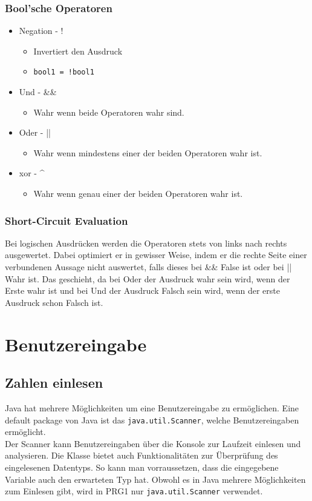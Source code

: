 \documentclass{article}
\begin{document}
	\subsubsection{Bool'sche Operatoren}
	\begin{itemize}
		\item{Negation - !}
		\begin{itemize}
			\item{Invertiert den Ausdruck}
			\item{\verb|bool1 = !bool1|}
		\end{itemize}
		\item{Und - \&\&}
		\begin{itemize}
			\item{Wahr wenn beide Operatoren wahr sind.}
		\end{itemize}
		\item{Oder - ||}
		\begin{itemize}
			\item{Wahr wenn mindestens einer der beiden Operatoren wahr ist.}
		\end{itemize}
		\item{xor - \^{}}
		\begin{itemize}
			\item{Wahr wenn genau einer der beiden Operatoren wahr ist.}
		\end{itemize}
	\end{itemize}
	\subsubsection{Short-Circuit Evaluation}
	Bei logischen Ausdrücken werden die Operatoren stets von links nach rechts ausgewertet. Dabei optimiert er in gewisser Weise, indem er die rechte Seite einer verbundenen Aussage nicht auswertet, falls dieses bei \&\& False ist oder bei || Wahr ist. Das geschieht, da bei Oder der Ausdruck wahr sein wird, wenn der Erste wahr ist und bei Und der Ausdruck Falsch sein wird, wenn der erste Ausdruck schon Falsch ist.
	\section{Benutzereingabe}
	\subsection{Zahlen einlesen}
	Java hat mehrere Möglichkeiten um eine Benutzereingabe zu ermöglichen. Eine default package von Java ist das \verb|java.util.Scanner|, welche Benutzereingaben ermöglicht. \\
	Der Scanner kann Benutzereingaben über die Konsole zur Laufzeit einlesen und analysieren. Die Klasse bietet auch Funktionalitäten zur Überprüfung des eingelesenen Datentyps. So kann man vorraussetzen, dass die eingegebene Variable auch den erwarteten Typ hat. Obwohl es in Java mehrere Möglichkeiten zum Einlesen gibt, wird in PRG1 nur \verb|java.util.Scanner| verwendet. \\
\end{document}
